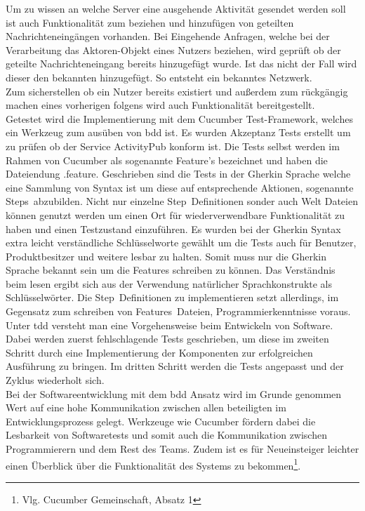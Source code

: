 Um zu wissen an welche Server eine ausgehende Aktivität gesendet werden soll ist auch Funktionalität zum beziehen und hinzufügen von geteilten Nachrichteneingängen vorhanden. Bei Eingehende Anfragen, welche bei der Verarbeitung das Aktoren-Objekt eines Nutzers beziehen, wird geprüft ob der geteilte Nachrichteneingang bereits hinzugefügt wurde. Ist das nicht der Fall wird dieser den bekannten hinzugefügt. So entsteht ein \glqq bekanntes Netzwerk\grqq.\\

Zum sicherstellen ob ein Nutzer bereits existiert und außerdem zum rückgängig machen eines vorherigen folgens wird auch Funktionalität bereitgestellt.\\

Getestet wird die Implementierung mit dem Cucumber Test-Framework, welches ein Werkzeug zum ausüben von \gls{bdd} ist. Es wurden Akzeptanz Tests erstellt um zu prüfen ob der Service ActivityPub konform ist. Die Tests selbst werden im Rahmen von Cucumber als sogenannte \glqq Feature\grqq's bezeichnet und haben die Dateiendung \glqq .feature\grqq. Geschrieben sind die Tests in der Gherkin Sprache welche eine Sammlung von Syntax ist um diese auf entsprechende Aktionen, sogenannte \glqq Steps\grqq~abzubilden. Nicht nur einzelne \glqq Step\grqq~Definitionen sonder auch Welt Dateien können genutzt werden um einen Ort für wiederverwendbare Funktionalität zu haben und einen Testzustand einzuführen. Es wurden bei der Gherkin Syntax extra leicht verständliche Schlüsselworte gewählt um die Tests auch für Benutzer, Produktbesitzer und weitere lesbar zu halten. Somit muss nur die Gherkin Sprache bekannt sein um die Features schreiben zu können. Das Verständnis beim lesen ergibt sich aus der Verwendung natürlicher Sprachkonstrukte als Schlüsselwörter. Die \glqq Step\grqq~Definitionen zu implementieren setzt allerdings, im Gegensatz zum schreiben von \glqq Features\grqq~Dateien, Programmierkenntnisse voraus.\\

Unter \gls{tdd} versteht man eine Vorgehensweise beim Entwickeln von Software. Dabei werden zuerst fehlschlagende Tests geschrieben, um diese im zweiten Schritt durch eine Implementierung der Komponenten zur erfolgreichen Ausführung zu bringen. Im dritten Schritt werden die Tests angepasst und der Zyklus wiederholt sich.\\

Bei der Softwareentwicklung mit dem \gls{bdd} Ansatz wird im Grunde genommen Wert auf eine hohe Kommunikation zwischen allen beteiligten im Entwicklungsprozess gelegt. Werkzeuge wie Cucumber fördern dabei die Lesbarkeit von Softwaretests und somit auch die Kommunikation zwischen Programmierern und dem Rest des Teams. Zudem ist es für Neueinsteiger leichter einen Überblick über die Funktionalität des Systems zu bekommen\footnote{Vlg. Cucumber Gemeinschaft, Absatz 1}.\\
 
